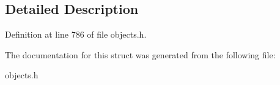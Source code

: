 \subsection{Detailed Description}


Definition at line 786 of file objects.\+h.



The documentation for this struct was generated from the following file\+:\begin{DoxyCompactItemize}
\item 
objects.\+h\end{DoxyCompactItemize}
